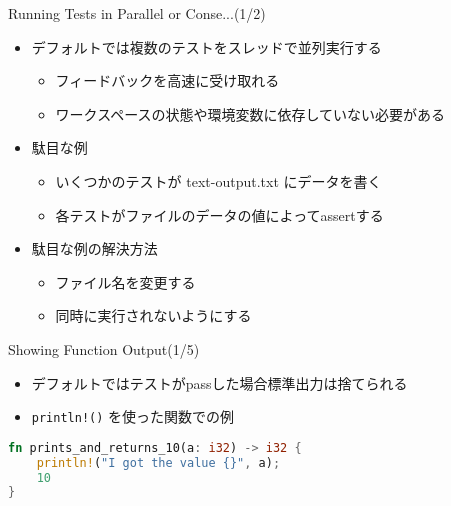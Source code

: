 \documentclass[cjk,14pt,xcolor=dvipsnames,table,dvipdfmx,professional font,t,fragile]{beamer}
\newenvironment{commandline}%
{\VerbatimEnvironment
  \begin{Sbox}\begin{minipage}{0.9\hsize}\begin{fontsize}{8}{8} \color{white} \begin{BVerbatim}}%
{\end{BVerbatim}\end{fontsize}\end{minipage}\end{Sbox}
  \setlength{\fboxsep}{8pt}

\vspace{6pt}%
\fcolorbox{white}{black}{\TheSbox}

\vspace{3pt}%
}
\begin{document}
\begin{frame}[fragile]{Running Tests in Parallel or Conse...(1/2)}
 \begin{itemize}
  \item デフォルトでは複数のテストをスレッドで並列実行する
	\begin{itemize}
	 \item フィードバックを高速に受け取れる
	 \item ワークスペースの状態や環境変数に依存していない必要がある
	\end{itemize}
  \item 駄目な例
	\begin{itemize}
	 \item いくつかのテストが text-output.txt にデータを書く
	 \item 各テストがファイルのデータの値によってassertする
	\end{itemize}
  \item 駄目な例の解決方法
	\begin{itemize}
	 \item ファイル名を変更する
	 \item 同時に実行されないようにする
	\end{itemize}
 \end{itemize}
\end{frame}


\begin{frame}[fragile]{Showing Function Output(1/5)}
\begin{itemize}
 \item デフォルトではテストがpassした場合標準出力は捨てられる
 \item \verb|println!()| を使った関数での例
\end{itemize}
 {\scriptsize
\begin{lstlisting}[language=Rust,style=boxed,style=colouredRust]
fn prints_and_returns_10(a: i32) -> i32 {
    println!("I got the value {}", a);
    10
}\end{lstlisting}}
\end{frame}
\end{document}
